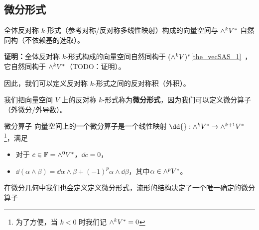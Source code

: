 

\subsection{微分形式}

\begin{theorem}{}
全体反对称 $k$-形式（参考对称/反对称多线性映射）构成的向量空间与 ${\large \wedge}^k V^*$ 自然同构（不依赖基的选取）。
\end{theorem}

\textbf{证明：}全体反对称 $k$-形式构成的向量空间自然同构于 $({\large \wedge}^k V)^*$\autoref{the_vecSAS_1}~，它自然同构于 ${\large \wedge}^k V^*$（TODO：证明）。

因此，我们可以定义反对称 $k$-形式之间的反对称积（外积）。

我们把向量空间 $V$ 上的反对称 $k$-形式称为\textbf{微分形式}，因为我们可以定义微分算子（外微分/外导数）。

\begin{definition}{微分算子}
向量空间上的一个微分算子是一个线性映射 $\dd{} : {\large \wedge}^k V^* \to {\large \wedge}^{k + 1} V^*$\footnote{为了方便，当 $k < 0$ 时我们记 ${\large \wedge}^k V^* = 0$}，满足
\begin{itemize}
\item 对于 $c \in \mathbb{F} = {\large \wedge}^0 V^*$，$\dd c = 0$，
\item $\dd(\alpha \wedge \beta) = \dd\alpha \wedge \beta + (-1)^p \alpha \wedge \dd\beta$，其中$\alpha \in {\large \wedge}^p V^*$。
\end{itemize}

在微分几何中我们也会定义定义微分形式，流形的结构决定了一个唯一确定的微分算子


\end{definition}

